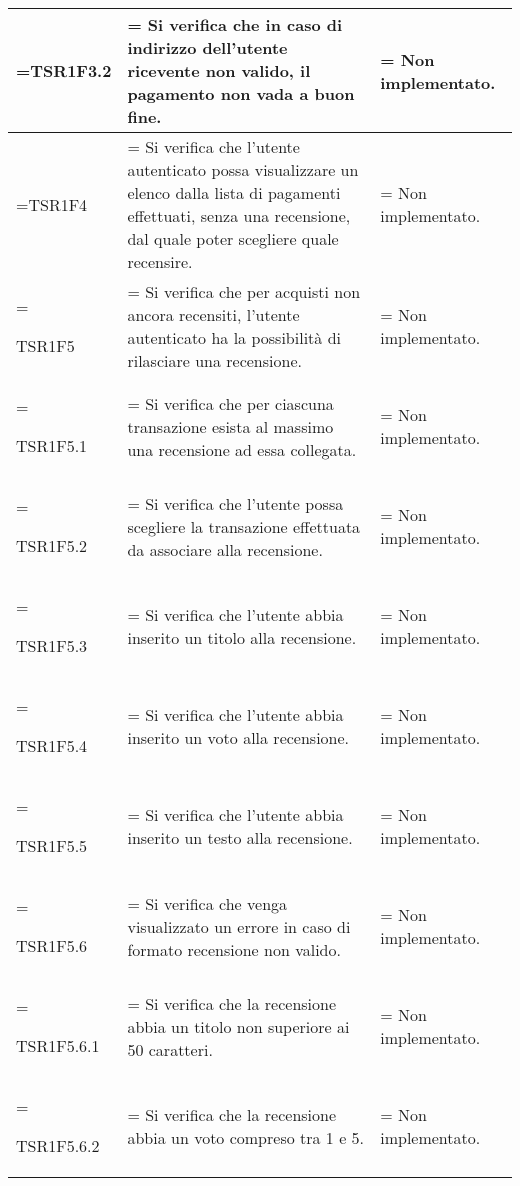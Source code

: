 \begin{xltabular}{\textwidth} {
            >{\hsize\linewidth=\hsize}X
            >{\hsize\linewidth=\hsize}X
            >{\hsize\linewidth=\hsize}X
        }
        TSR1F3.2&
        Si verifica che in caso di indirizzo dell'utente ricevente non valido, il pagamento non vada a buon fine.&
        Non implementato.
        \\ \hline
        
        TSR1F4&
        Si verifica che l'utente autenticato possa visualizzare un elenco dalla lista di pagamenti effettuati, senza una recensione, dal quale poter scegliere quale recensire.&
        Non implementato.
        \\ \hline

        TSR1F5&
        Si verifica che per acquisti non ancora recensiti, l'utente autenticato ha la possibilità di rilasciare una recensione.&
        Non implementato.
        \\ \hline

        TSR1F5.1&
        Si verifica che per ciascuna transazione esista al massimo una recensione ad essa collegata.&
        Non implementato.
        \\ \hline
        
        TSR1F5.2&
        Si verifica che l'utente possa scegliere la transazione effettuata da associare alla recensione.&
        Non implementato.
        \\ \hline

        TSR1F5.3&
        Si verifica che l'utente abbia inserito un titolo alla recensione.&
        Non implementato.
        \\ \hline

        TSR1F5.4&
        Si verifica che l'utente abbia inserito un voto alla recensione.&
        Non implementato.
        \\ \hline

        TSR1F5.5&
        Si verifica che l'utente abbia inserito un testo alla recensione.&
        Non implementato.
        \\ \hline

        TSR1F5.6&
        Si verifica che venga visualizzato un errore in caso di formato recensione non valido.&
        Non implementato.
        \\ \hline
        
        TSR1F5.6.1&
        Si verifica che la recensione abbia un titolo non superiore ai 50 caratteri.&
        Non implementato.
        \\ \hline

        TSR1F5.6.2&
        Si verifica che la recensione abbia un voto compreso tra 1 e 5.&
        Non implementato.
        \\ \hline


\end{xltabular}
